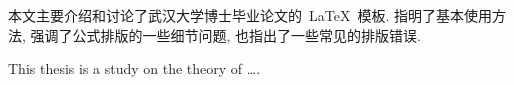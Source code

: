 
%

\begin{cnabstract}
本文主要介绍和讨论了武汉大学博士毕业论文的~\LaTeX~模板.
指明了基本使用方法, 强调了公式排版的一些细节问题, 也指出了一些常见的排版错误.



\end{cnabstract}
\vspace{1em}\par\vfill





\begin{enabstract}
This thesis is a study on the theory of \dots.




\end{enabstract}
\vspace{1em}\par\vfill

\enkeywords{\LaTeX{}, \dots}


